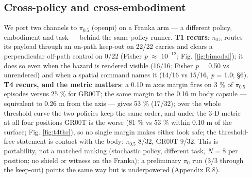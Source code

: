 \subsection{Cross-policy and cross-embodiment}


We port two channels to $\pi_{0.5}$ (openpi) on a Franka arm --- a different policy, embodiment and task --- behind the same policy runner. \textbf{T1 recurs}: $\pi_{0.5}$ routes its payload through an on-path keep-out on 22/22 carries and clears a perpendicular off-path control on 0/22 (Fisher \emph{p} $\approx$ $10^{-12}$; Fig. \ref{fig:bimodal}); it does so even when the hazard is rendered visible (16/16; Fisher \emph{p} = 0.50 vs unrendered) and when a spatial command names it (14/16 vs 15/16, \emph{p} = 1.0; \S6). \textbf{T4 recurs, and the metric matters}: a 0.10 m axis margin fires on 3 \% of $\pi_{0.5}$ episodes versus 25 \% for GR00T; the same margin to the 0.16 m body capsule --- equivalent to 0.26 m from the axis --- gives 53 \% (17/32); over the whole threshold curve the two policies keep the same order, and under the 3-D metric at all four positions GR00T is the worse (81 \% vs 53 \% within 0.10 m of the surface; Fig. \ref{fig:t4thr}), so no single margin makes either look safe; the threshold-free statement is contact with the body: $\pi_{0.5}$ 8/32, GR00T 9/32. This is portability, not a matched ranking (stochastic policy, different task, \emph{N} = 8 per position; no shield or witness on the Franka); a preliminary $\pi_0$ run (3/3 through the keep-out) points the same way but is underpowered (Appendix E.8).

